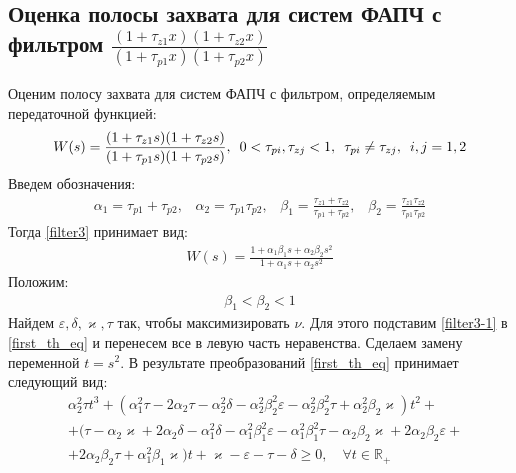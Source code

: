 \documentclass[a4paper,article,14pt]{extarticle}
\begin{document}
\subsection{Оценка полосы захвата для систем ФАПЧ с фильтром $\frac{(1+\tau_{z1}x)(1+\tau_{z2}x)}{(1+\tau_{p1}x)(1+\tau_{p2}x)}$}
Оценим полосу захвата для систем ФАПЧ с фильтром, определяемым передаточной функцией:
 \begin{equation}\label{filter3}
 \begin{aligned}
W(s) = \frac{(1+\tau_{z1}s)(1+\tau_{z2}s)}{(1+\tau_{p1}s)(1+\tau_{p2}s)}, \enskip 0<\tau_{pi},\tau_{zj} < 1, \enskip \tau_{pi} \neq \tau_{zj}, \enskip i,j=1,2
 \end{aligned}
\end{equation}
Введем обозначения:
 \begin{equation}
 \begin{aligned}
\alpha_1 = \tau_{p1} + \tau_{p2}\text{,}\quad 
\alpha_2 = \tau_{p1}\tau_{p2}\text{,}\quad 
\beta_1 = \frac{\tau_{z1}+\tau_{z2}}{\tau_{p1}+\tau_{p2}}\text{,}\quad 
\beta_2 = \frac{\tau_{z1}\tau_{z2}}{\tau_{p1}\tau_{p2}}
 \end{aligned}
\end{equation}
Тогда \eqref{filter3} принимает вид:
 \begin{equation}\label{filter3-1}
 \begin{aligned}
W(s) = \frac{1+\alpha_1\beta_1s + \alpha_2\beta_2s^2}{1+\alpha_1s + \alpha_2s^2}
 \end{aligned}
\end{equation}
Положим:
 \begin{equation}\label{restriction-1}
 \begin{aligned}
\beta_1 < \beta_2 < 1
 \end{aligned}
\end{equation}
Найдем $\varepsilon, \delta, \varkappa, \tau$ так, чтобы максимизировать $\nu$. Для этого подставим \eqref{filter3-1} в \eqref{first_th_eq} и перенесем все в левую часть неравенства. Сделаем замену переменной $t = s^2$. В результате преобразований \eqref{first_th_eq} принимает следующий вид:
 \begin{equation}\label{filter3-th_first-1}
 \begin{aligned}
&\alpha_2^2\tau t^3 + (\alpha_1^2\tau - 2\alpha_2\tau - \alpha_2^2\delta - \alpha_2^2\beta_2^2\varepsilon - \alpha_2^2\beta_2^2\tau + \alpha_2^2\beta_2\varkappa)t^2 +\\
&+ (\tau - \alpha_2\varkappa + 2\alpha_2\delta - \alpha_1^2\delta - \alpha_1^2\beta_1^2\varepsilon - \alpha_1^2\beta_1^2\tau - \alpha_2\beta_2\varkappa + 2\alpha_2\beta_2\varepsilon + \\
&+2\alpha_2\beta_2\tau + \alpha_1^2\beta_1\varkappa)t + \varkappa - \varepsilon - \tau - \delta \geqslant 0, \quad \forall t \in \mathbb{R_+}
 \end{aligned}
\end{equation}
\end{document}

